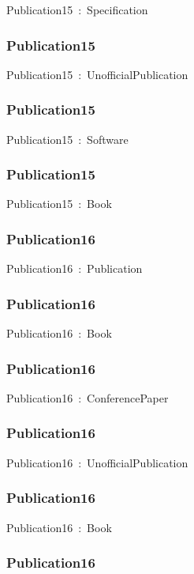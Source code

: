 \documentclass{article}
\begin{document}
Publication15~:~Specification

\subsubsection*{Publication15}

Publication15~:~UnofficialPublication

\subsubsection*{Publication15}

Publication15~:~Software

\subsubsection*{Publication15}

Publication15~:~Book

\subsubsection*{Publication16}

Publication16~:~Publication

\subsubsection*{Publication16}

Publication16~:~Book

\subsubsection*{Publication16}

Publication16~:~ConferencePaper

\subsubsection*{Publication16}

Publication16~:~UnofficialPublication

\subsubsection*{Publication16}

Publication16~:~Book

\subsubsection*{Publication16}
\end{document}
